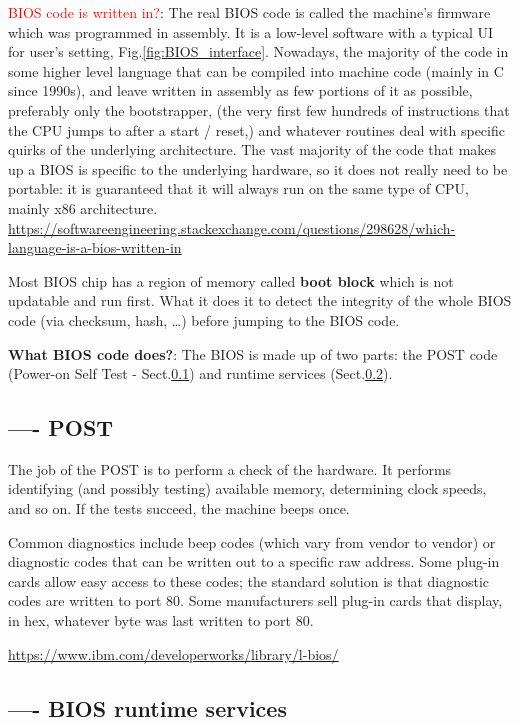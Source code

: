 \textcolor{red}{BIOS code is written in?}:
The real BIOS code is called the machine's firmware which was programmed in
assembly. It is a low-level software with a typical UI for user's setting,
Fig.\ref{fig:BIOS_interface}.
Nowadays, the majority of the code in some higher level language that can be
compiled into machine code (mainly in C since 1990s), and leave written in
assembly as few portions of it as possible, preferably only the bootstrapper,
(the very first few hundreds of instructions that the CPU jumps to after a start
/ reset,) and whatever routines deal with specific quirks of the underlying
architecture. The vast majority of the code that makes up a BIOS is specific to
the underlying hardware, so it does not really need to be portable:
it is guaranteed that it will always run on the same type of CPU, mainly x86
architecture.
\url{https://softwareengineering.stackexchange.com/questions/298628/which-language-is-a-bios-written-in}

Most BIOS chip has a region of memory called {\bf boot block} which is not
updatable and run first. What it does it to detect the integrity of the whole
BIOS code (via checksum, hash, \ldots) before jumping to the BIOS code.

{\bf What BIOS code does?}:  The BIOS is made up of two parts: the POST code
(Power-on Self Test - Sect.\ref{sec:POST}) and runtime services
(Sect.\ref{sec:BIOS-runtime-services}).

\subsection{---- POST}
\label{sec:POST}

The job of the POST is to perform a check of the hardware. 
It performs identifying (and possibly testing) available memory, determining
clock speeds, and so on.  If the tests succeed, the machine beeps once. 

Common diagnostics include beep codes (which vary from vendor to vendor) or
diagnostic codes that can be written out to a specific raw address. Some plug-in
cards allow easy access to these codes; the standard solution is that diagnostic
codes are written to port 80. Some manufacturers sell plug-in cards that
display, in hex, whatever byte was last written to port 80.

\url{https://www.ibm.com/developerworks/library/l-bios/}


\subsection{---- BIOS runtime services}
\label{sec:BIOS-runtime-services}

